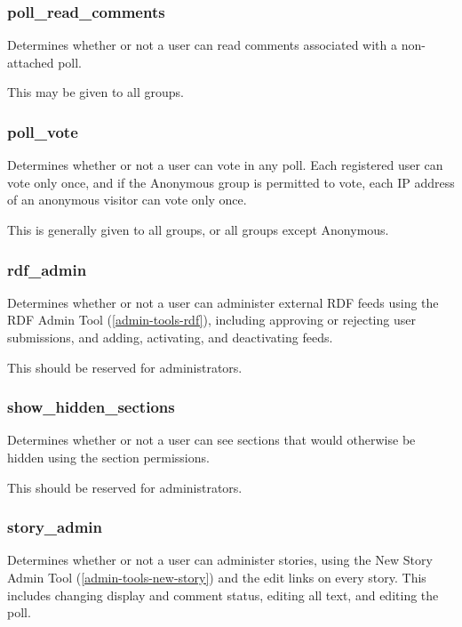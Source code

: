 \subsubsection{poll\_read\_comments}
\label{perm-poll-read-comments}

Determines whether or not a user can read comments associated with a non-attached poll.

This may be given to all groups.

\subsubsection{poll\_vote}
\label{perm-poll-vote}

Determines whether or not a user can vote in any poll.  Each registered user can vote only once, and if the Anonymous group is permitted to vote, each IP address of an anonymous visitor can vote only once.

This is generally given to all groups, or all groups except Anonymous.

\subsubsection{rdf\_admin}
\label{perm-rdf-admin}

Determines whether or not a user can administer external RDF feeds using the RDF Admin Tool (\ref{admin-tools-rdf}), including approving or rejecting user submissions, and adding, activating, and deactivating feeds.

This should be reserved for administrators. 

\subsubsection{show\_hidden\_sections}
\label{perm-show-hidden-sections}

Determines whether or not a user can see sections that would otherwise be hidden using the section permissions.

This should be reserved for administrators.

\subsubsection{story\_admin}
\label{perm-story-admin}

Determines whether or not a user can administer stories, using the New Story Admin Tool (\ref{admin-tools-new-story}) and the edit links on every story.  This includes changing display and comment status, editing all text, and editing the poll.

